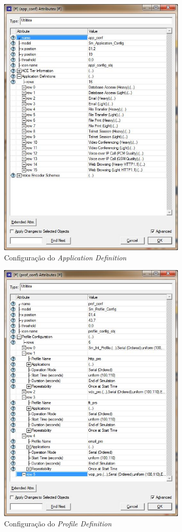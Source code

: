 \documentclass[brazil,times,12pt]{abnt}
\begin{document}
\begin{figure}[htp]
\begin{center}
  \includegraphics[width=90mm]{SimulacaoRede/AppConf.jpg}
  \caption[app-def-conf]{Configuração do \emph{Application Definition}}
  \label{app-def-conf}
\end{center}
\end{figure}

\begin{figure}[htp]
\begin{center}
  \includegraphics[width=90mm]{SimulacaoRede/ProfConf.jpg}
  \caption[prof-def-conf]{Configuração do \emph{Profile Definition}}
  \label{prof-def-conf}
\end{center}
\end{figure}
\end{document}
